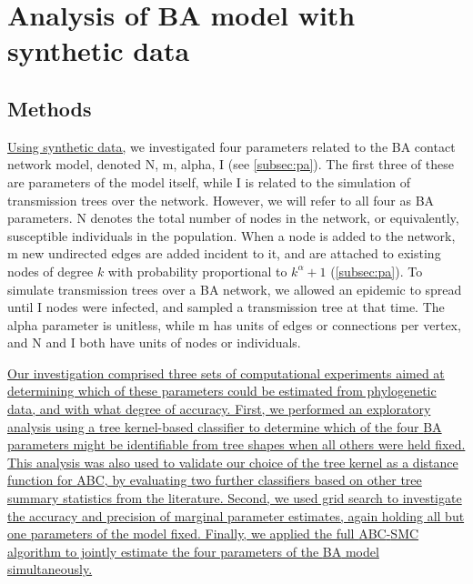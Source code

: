 \section{Analysis of \acrlong{BA} model with synthetic data}
\label{sec:ba}

\subsection{Methods}


{\color{blue}\uline{Using synthetic data,}} we investigated four parameters
related to the \gls{BA} contact network model, denoted \gls{N}, \gls{m},
\gls{alpha}, \gls{I} (see \cref{subsec:pa}). The first three of these are
parameters of the model itself, while \gls{I} is related to the simulation of
transmission trees over the network. However, we will refer to all four as
\gls{BA} parameters. \gls{N} denotes the total number of nodes in the network,
or equivalently, susceptible individuals in the population. When a node is
added to the network, \gls{m} new undirected edges are added incident to it,
and are attached to existing nodes of degree $k$ with probability proportional
to $k^\alpha + 1$ (\cref{subsec:pa}). To simulate transmission trees over a
\gls{BA} network, we allowed an epidemic to spread until \gls{I} nodes were
infected, and sampled a transmission tree at that time. The \gls{alpha}
parameter is unitless, while \gls{m} has units of edges or connections per
vertex, and \gls{N} and \gls{I} both have units of nodes or individuals.

{\color{blue}\uline{Our investigation comprised three sets of computational
experiments aimed at determining which of these parameters could be estimated
from phylogenetic data, and with what degree of accuracy. First, we performed
an exploratory analysis using a tree kernel-based classifier to determine which
of the four \gls{BA} parameters might be identifiable from tree shapes when all
others were held fixed. This analysis was also used to validate our choice of
the tree kernel as a distance function for \gls{ABC}, by evaluating two further
classifiers based on other tree summary statistics from the literature. Second,
we used grid search to investigate the accuracy and precision of marginal
parameter estimates, again holding all but one parameters of the model fixed.
Finally, we applied the full \gls{ABC}-\gls{SMC} algorithm to jointly estimate
the four parameters of the \gls{BA} model simultaneously.}}

